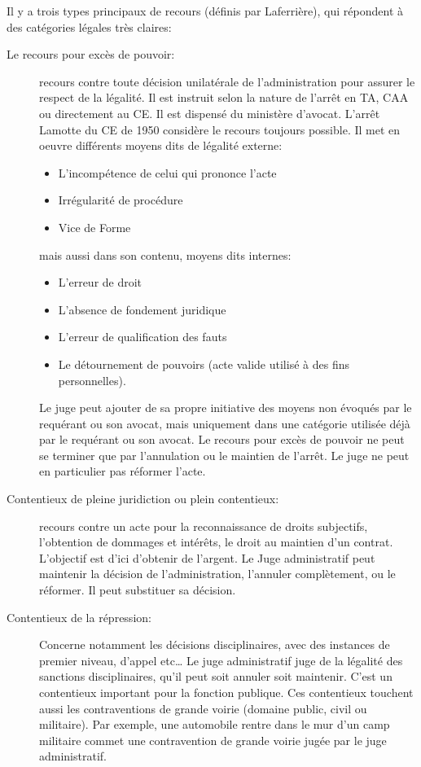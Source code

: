 \documentclass[math]{cours}
\begin{document}
Il y a trois types principaux de recours (définis par Laferrière), qui répondent à des catégories légales très claires:
\begin{description}
	\item[Le recours pour excès de pouvoir:]
		recours contre toute décision unilatérale de l'administration pour assurer le respect de la légalité.
		Il est instruit selon la nature de l'arrêt en TA, CAA ou directement au CE.
		Il est dispensé du ministère d'avocat.
		L'arrêt Lamotte du CE de 1950 considère le recours toujours possible.
		Il met en oeuvre différents moyens dits de légalité externe:
		\begin{itemize}
			\item L'incompétence de celui qui prononce l'acte
			\item Irrégularité de procédure
			\item Vice de Forme
		\end{itemize}
		mais aussi dans son contenu, moyens dits internes:
		\begin{itemize}
			\item L'erreur de droit
			\item L'absence de fondement juridique
			\item L'erreur de qualification des fauts
			\item Le détournement de pouvoirs (acte valide utilisé à des fins personnelles).
		\end{itemize}
		Le juge peut ajouter de sa propre initiative des moyens non évoqués par le requérant ou son avocat, mais uniquement dans une catégorie utilisée déjà par le requérant ou son avocat.
		Le recours pour excès de pouvoir ne peut se terminer que par l'annulation ou le maintien de l'arrêt.
		Le juge ne peut en particulier pas réformer l'acte.
	\item[Contentieux de pleine juridiction ou plein contentieux:]
		recours contre un acte pour la reconnaissance de droits subjectifs, l'obtention de dommages et intérêts,
		le droit au maintien d'un contrat.
		L'objectif est d'ici d'obtenir de l'argent.
		Le Juge administratif peut maintenir la décision de l'administration, l'annuler complètement, ou le réformer.
		Il peut substituer sa décision.
	\item[Contentieux de la répression:]
		Concerne notamment les décisions disciplinaires, avec des instances de premier niveau, d'appel etc\ldots
		Le juge administratif juge de la légalité des sanctions disciplinaires, qu'il peut soit annuler soit maintenir.
		C'est un contentieux important pour la fonction publique.
		Ces contentieux touchent aussi les contraventions de grande voirie (domaine public, civil ou militaire).
		Par exemple, une automobile rentre dans le mur d'un camp militaire commet une contravention de grande voirie jugée par le juge administratif.
\end{description}
\end{document}
